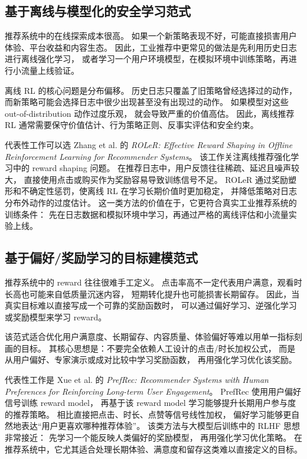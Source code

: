 \documentclass[11pt]{ctexart}
\begin{document}
\subsection{基于离线与模型化的安全学习范式}

推荐系统中的在线探索成本很高。
如果一个新策略表现不好，可能直接损害用户体验、平台收益和内容生态。
因此，工业推荐中更常见的做法是先利用历史日志进行离线强化学习，
或者学习一个用户环境模型，在模拟环境中训练策略，再进行小流量上线验证。

离线 RL 的核心问题是分布偏移。
历史日志只覆盖了旧策略曾经选择过的动作，
而新策略可能会选择日志中很少出现甚至没有出现过的动作。
如果模型对这些 out-of-distribution 动作过度乐观，
就会导致严重的价值高估。
因此，离线推荐 RL 通常需要保守价值估计、行为策略正则、反事实评估和安全约束。

代表性工作可以选 Zhang et al. 的
\textit{ROLeR: Effective Reward Shaping in Offline Reinforcement Learning for Recommender Systems}。
该工作关注离线推荐强化学习中的 reward shaping 问题。
在推荐日志中，用户反馈往往稀疏、延迟且噪声较大，
直接使用点击或购买作为奖励容易导致训练信号不足。
ROLeR 通过奖励塑形和不确定性惩罚，使离线 RL 在学习长期价值时更加稳定，
并降低策略对日志分布外动作的过度估计。
这一类方法的价值在于，它更符合真实工业推荐系统的训练条件：
先在日志数据和模拟环境中学习，再通过严格的离线评估和小流量实验上线。

\subsection{基于偏好/奖励学习的目标建模范式}

推荐系统中的 reward 往往很难手工定义。
点击率高不一定代表用户满意，观看时长高也可能来自低质量沉迷内容，
短期转化提升也可能损害长期留存。
因此，当真实目标难以直接写成一个可靠的奖励函数时，
可以通过偏好学习、逆强化学习或奖励模型来学习 reward。

该范式适合优化用户满意度、长期留存、内容质量、体验偏好等难以用单一指标刻画的目标。
其核心思想是：不要完全依赖人工设计的点击/时长加权公式，
而是从用户偏好、专家演示或成对比较中学习奖励函数，
再用强化学习优化该奖励。

代表性工作是 Xue et al. 的
\textit{PrefRec: Recommender Systems with Human Preferences for Reinforcing Long-term User Engagement}。
PrefRec 使用用户偏好信号训练 reward model，
再基于该 reward model 学习能够提升长期用户参与度的推荐策略。
相比直接把点击、时长、点赞等信号线性加权，
偏好学习能够更自然地表达``用户更喜欢哪种推荐体验''。
该类方法与大模型后训练中的 RLHF 思想非常接近：
先学习一个能反映人类偏好的奖励模型，
再用强化学习优化策略。
在推荐系统中，它尤其适合处理长期体验、满意度和留存这类难以直接定义的目标。
\end{document}
